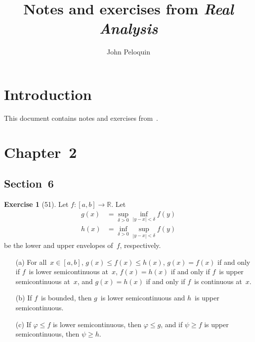 \documentclass[letterpaper,12pt]{article}
\title{Notes and exercises from \textit{Real Analysis}}
\author{John Peloquin}
\date{}
\newcommand{\R}{\mathbb{R}}
\newcommand{\abs}[1]{|{#1}|}
\theoremstyle{plain}
\theoremstyle{definition}
\newtheorem*{exer}{Exercise}
\theoremstyle{remark}
\begin{document}
\maketitle

\section*{Introduction}
This document contains notes and exercises from~\cite{royden}.

\section*{Chapter~2}
\subsection*{Section~6}
\begin{exer}[51]
Let \(f:[a,b]\to\R\). Let
\begin{align*}
g(x)&=\sup_{\delta>0}\inf_{\abs{y-x}<\delta}f(y)\\
h(x)&=\inf_{\delta>0}\sup_{\abs{y-x}<\delta}f(y)
\end{align*}
be the lower and upper envelopes of~\(f\), respectively.
\begin{enumerate}
\item[(a)] For all~\(x\in[a,b]\), \(g(x)\le f(x)\le h(x)\), \(g(x)=f(x)\) if and only if \(f\)~is lower semicontinuous at~\(x\), \(f(x)=h(x)\) if and only if \(f\)~is upper semicontinuous at~\(x\), and \(g(x)=h(x)\) if and only if \(f\)~is continuous at~\(x\).
\item[(b)] If \(f\)~is bounded, then \(g\)~is lower semicontinuous and \(h\)~is upper semicontinuous.
\item[(c)] If \(\varphi\le f\) is lower semicontinuous, then \(\varphi\le g\), and if \(\psi\ge f\) is upper semicontinuous, then \(\psi\ge h\).
\end{enumerate}
\end{exer}
\end{document}
